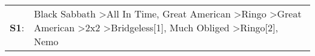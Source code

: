 \begin{supertabular}{p{0.03\textwidth}p{0.92\textwidth}}
 \textbf{S1}:  &  Black Sabbath\textsuperscript{} \textgreater \enspace All In Time\textsuperscript{}, \enspace Great American\textsuperscript{} \textgreater \enspace Ringo\textsuperscript{} \textgreater \enspace Great American\textsuperscript{} \textgreater \enspace 2x2\textsuperscript{} \textgreater \enspace Bridgeless[1]\textsuperscript{}, \enspace Much Obliged\textsuperscript{} \textgreater \enspace Ringo[2]\textsuperscript{}, \enspace Nemo\textsuperscript{}  \enspace  \\
\end{supertabular}
